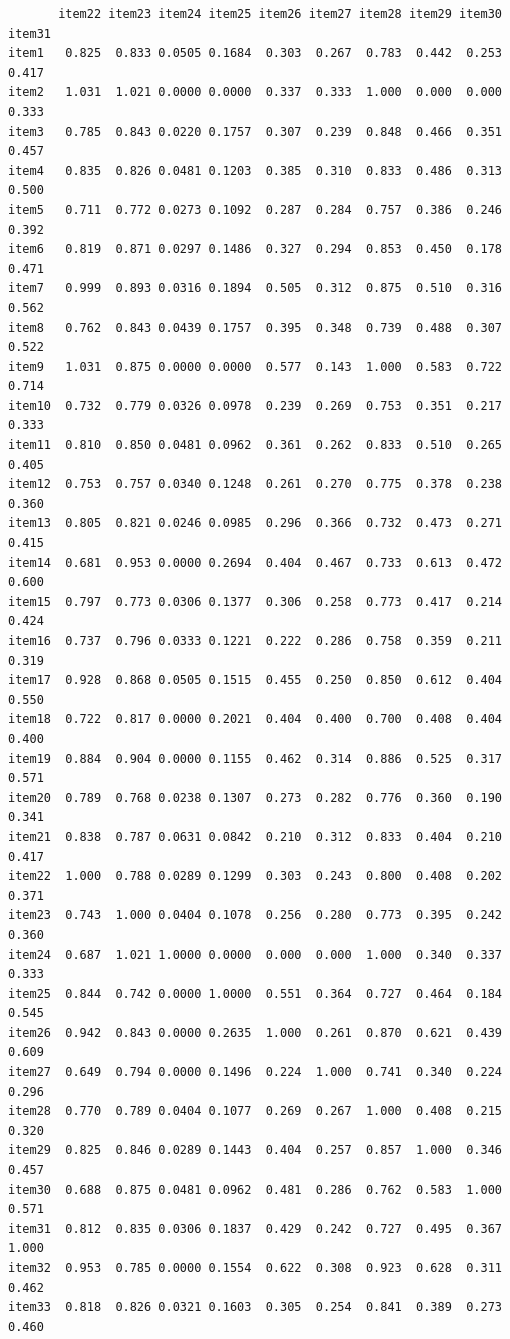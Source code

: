 \documentclass[
  a4paper,
]{ltjsbook}
\begin{document}
\begin{verbatim}
       item22 item23 item24 item25 item26 item27 item28 item29 item30 item31
item1   0.825  0.833 0.0505 0.1684  0.303  0.267  0.783  0.442  0.253  0.417
item2   1.031  1.021 0.0000 0.0000  0.337  0.333  1.000  0.000  0.000  0.333
item3   0.785  0.843 0.0220 0.1757  0.307  0.239  0.848  0.466  0.351  0.457
item4   0.835  0.826 0.0481 0.1203  0.385  0.310  0.833  0.486  0.313  0.500
item5   0.711  0.772 0.0273 0.1092  0.287  0.284  0.757  0.386  0.246  0.392
item6   0.819  0.871 0.0297 0.1486  0.327  0.294  0.853  0.450  0.178  0.471
item7   0.999  0.893 0.0316 0.1894  0.505  0.312  0.875  0.510  0.316  0.562
item8   0.762  0.843 0.0439 0.1757  0.395  0.348  0.739  0.488  0.307  0.522
item9   1.031  0.875 0.0000 0.0000  0.577  0.143  1.000  0.583  0.722  0.714
item10  0.732  0.779 0.0326 0.0978  0.239  0.269  0.753  0.351  0.217  0.333
item11  0.810  0.850 0.0481 0.0962  0.361  0.262  0.833  0.510  0.265  0.405
item12  0.753  0.757 0.0340 0.1248  0.261  0.270  0.775  0.378  0.238  0.360
item13  0.805  0.821 0.0246 0.0985  0.296  0.366  0.732  0.473  0.271  0.415
item14  0.681  0.953 0.0000 0.2694  0.404  0.467  0.733  0.613  0.472  0.600
item15  0.797  0.773 0.0306 0.1377  0.306  0.258  0.773  0.417  0.214  0.424
item16  0.737  0.796 0.0333 0.1221  0.222  0.286  0.758  0.359  0.211  0.319
item17  0.928  0.868 0.0505 0.1515  0.455  0.250  0.850  0.612  0.404  0.550
item18  0.722  0.817 0.0000 0.2021  0.404  0.400  0.700  0.408  0.404  0.400
item19  0.884  0.904 0.0000 0.1155  0.462  0.314  0.886  0.525  0.317  0.571
item20  0.789  0.768 0.0238 0.1307  0.273  0.282  0.776  0.360  0.190  0.341
item21  0.838  0.787 0.0631 0.0842  0.210  0.312  0.833  0.404  0.210  0.417
item22  1.000  0.788 0.0289 0.1299  0.303  0.243  0.800  0.408  0.202  0.371
item23  0.743  1.000 0.0404 0.1078  0.256  0.280  0.773  0.395  0.242  0.360
item24  0.687  1.021 1.0000 0.0000  0.000  0.000  1.000  0.340  0.337  0.333
item25  0.844  0.742 0.0000 1.0000  0.551  0.364  0.727  0.464  0.184  0.545
item26  0.942  0.843 0.0000 0.2635  1.000  0.261  0.870  0.621  0.439  0.609
item27  0.649  0.794 0.0000 0.1496  0.224  1.000  0.741  0.340  0.224  0.296
item28  0.770  0.789 0.0404 0.1077  0.269  0.267  1.000  0.408  0.215  0.320
item29  0.825  0.846 0.0289 0.1443  0.404  0.257  0.857  1.000  0.346  0.457
item30  0.688  0.875 0.0481 0.0962  0.481  0.286  0.762  0.583  1.000  0.571
item31  0.812  0.835 0.0306 0.1837  0.429  0.242  0.727  0.495  0.367  1.000
item32  0.953  0.785 0.0000 0.1554  0.622  0.308  0.923  0.628  0.311  0.462
item33  0.818  0.826 0.0321 0.1603  0.305  0.254  0.841  0.389  0.273  0.460

\end{verbatim}
\end{document}
